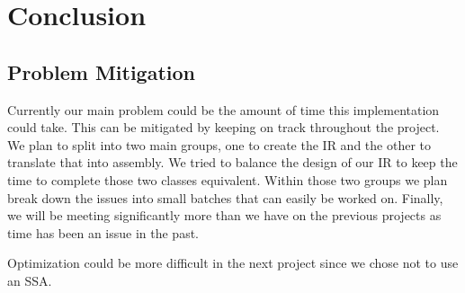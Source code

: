 \documentclass[10pt, onecolumn]{extarticle}
\begin{document}
\section{Conclusion}

\subsection{Problem Mitigation}
Currently our main problem could be the amount of time this implementation could take. This can be mitigated by keeping on track throughout the project. We plan to split into two main groups, one to create the IR and the other to translate that into assembly. We tried to balance the design of our IR to keep the time to complete those two classes equivalent. Within those two groups we plan break down the issues into small batches that can easily be worked on. Finally, we will be meeting significantly more than we have on the previous projects as time has been an issue in the past. 

Optimization could be more difficult in the next project since we chose not to use an SSA. 
\end{document}
